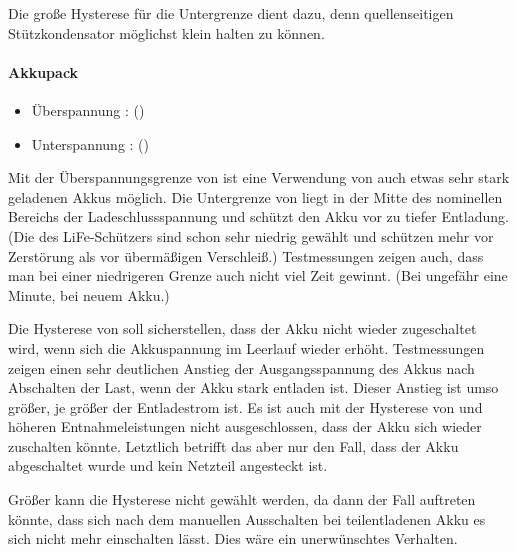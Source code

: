 Die große Hysterese für die Untergrenze dient dazu, denn quellenseitigen Stützkondensator möglichst klein halten zu können.



\paragraph{Akkupack}
\begin{itemize}
	\item Überspannung :  ()
	\item Unterspannung :  ()
\end{itemize}

Mit der Überspannungsgrenze von  ist eine Verwendung von auch etwas sehr stark geladenen Akkus möglich. Die Untergrenze von  liegt in der Mitte des nominellen Bereichs der Ladeschlussspannung und schützt den Akku vor zu tiefer Entladung. (Die  des LiFe-Schützers sind schon sehr niedrig gewählt und schützen mehr vor Zerstörung als vor übermäßigen Verschleiß.) Testmessungen zeigen auch, dass man bei einer niedrigeren Grenze auch nicht viel Zeit gewinnt. (Bei  ungefähr eine Minute, bei neuem Akku.)

Die Hysterese von  soll sicherstellen, dass der Akku nicht wieder zugeschaltet wird, wenn sich die Akkuspannung im Leerlauf wieder erhöht. Testmessungen zeigen einen sehr deutlichen Anstieg der Ausgangsspannung des Akkus nach Abschalten der Last, wenn der Akku stark entladen ist. Dieser Anstieg ist umso größer, je größer der Entladestrom ist. Es ist auch mit der Hysterese von  und höheren Entnahmeleistungen nicht ausgeschlossen, dass der Akku sich wieder zuschalten könnte. Letztlich betrifft das aber nur den Fall, dass der Akku abgeschaltet wurde und kein Netzteil angesteckt ist.

Größer kann die Hysterese nicht gewählt werden, da dann der Fall auftreten könnte, dass sich nach dem manuellen Ausschalten bei teilentladenen Akku es sich nicht mehr einschalten lässt. Dies wäre ein unerwünschtes Verhalten.



